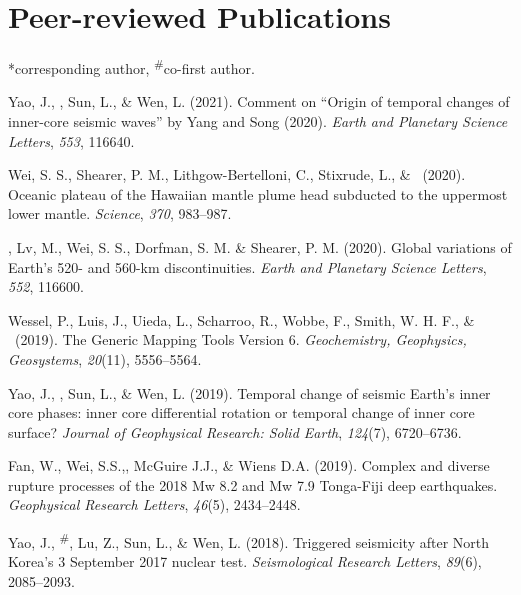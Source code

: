\section{Peer-reviewed Publications}
\newcommand{\Revision}{\emph{under revision}}
\newcommand{\CS}{*} %
\newcommand{\CF}{\textsuperscript{\#}} %

\CS corresponding author, \CF co-first author.
\begin{etaremune}
\item Yao, J., \Tian, Sun, L., \& Wen, L. (2021).
	Comment on ``Origin of temporal changes of inner-core seismic waves'' by Yang and Song (2020).
	\emph{Earth and Planetary Science Letters}, \emph{553}, 116640.
\item Wei, S. S., Shearer, P. M., Lithgow-Bertelloni, C., Stixrude, L., \& \Tian\ (2020).
	Oceanic plateau of the Hawaiian mantle plume head subducted to the uppermost lower mantle.
	\emph{Science}, \emph{370}, 983--987.
\item \Tian\CS, Lv, M., Wei, S. S., Dorfman, S. M. \& Shearer, P. M. (2020).
	Global variations of Earth's 520- and 560-km discontinuities.
	\emph{Earth and Planetary Science Letters}, \emph{552}, 116600. \\
\item
    Wessel, P., Luis, J., Uieda, L., Scharroo, R., Wobbe, F., Smith, W. H. F., \& \Tian\ (2019).
    The Generic Mapping Tools Version 6.
    \emph{Geochemistry, Geophysics, Geosystems}, \emph{20}(11), 5556--5564.
\item
    Yao, J., \Tian, Sun, L., \& Wen, L. (2019).
    Temporal change of seismic Earth's inner core phases: inner core differential rotation or temporal change of inner core surface?
    \emph{Journal of Geophysical Research: Solid Earth}, \emph{124}(7), 6720--6736.
\item
    Fan, W., Wei, S.S.,\Tian, McGuire J.J., \& Wiens D.A. (2019).
    Complex and diverse rupture processes of the 2018 Mw 8.2 and Mw 7.9 Tonga-Fiji deep earthquakes.
    \emph{Geophysical Research Letters}, \emph{46}(5), 2434--2448.
\item
    Yao, J., \Tian\CF, Lu, Z., Sun, L., \& Wen, L. (2018).
    Triggered seismicity after North Korea's 3 September 2017 nuclear test.
    \emph{Seismological Research Letters}, \emph{89}(6), 2085--2093.

\end{etaremune}
